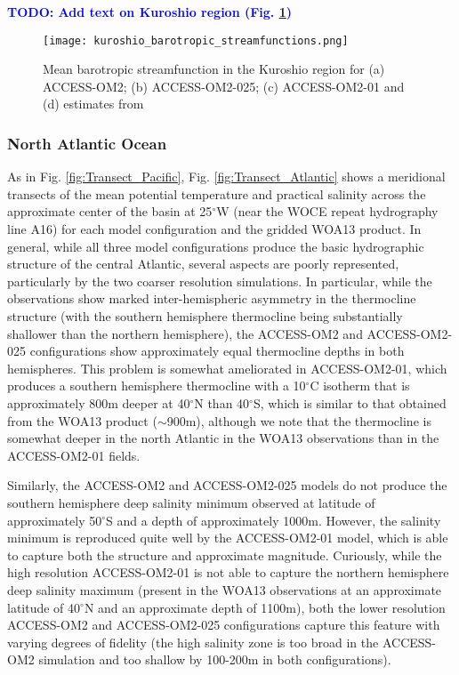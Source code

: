 \documentclass[gmd, manuscript]{copernicus}
\newcommand{\TODO}[1]{\textcolor{blue}{\textsf{\textbf{TODO: #1}}}}
\begin{document}
\TODO{Add text on Kuroshio region (Fig. \ref{fig:kuroshio})}


\begin{figure}[t]
\texttt{[image: kuroshio\_barotropic\_streamfunctions.png]}
\caption{Mean barotropic streamfunction in the Kuroshio region for (a)  ACCESS-OM2; (b) ACCESS-OM2-025; (c) ACCESS-OM2-01 and (d) estimates from \citep{cdvo:2016} \label{fig:kuroshio}}
\end{figure}

\subsubsection{North Atlantic Ocean}

As in Fig. \ref{fig:Transect_Pacific}, Fig. \ref{fig:Transect_Atlantic} shows a meridional transects of the mean potential temperature and practical salinity across the approximate center of the basin at 25$^{\circ}$W (near the WOCE repeat hydrography line A16) for each model configuration and the gridded WOA13 product. In general, while all three model configurations produce the basic hydrographic structure of the central Atlantic, several aspects are poorly represented, particularly by the two coarser resolution simulations. In particular, while the observations show marked inter-hemispheric asymmetry in the thermocline structure (with the southern hemisphere thermocline being substantially shallower than the northern hemisphere), the ACCESS-OM2 and ACCESS-OM2-025 configurations show approximately equal thermocline depths in both hemispheres. This problem is somewhat ameliorated in ACCESS-OM2-01, which produces a southern hemisphere thermocline with a 10$^{\circ}$C isotherm that is approximately 800m deeper at 40$^{\circ}$N than 40$^{\circ}$S, which is similar to that obtained from the WOA13 product ($\sim$900m), although we note that the thermocline is somewhat deeper in the north Atlantic in the WOA13 observations than in the ACCESS-OM2-01 fields. 

Similarly, the ACCESS-OM2 and ACCESS-OM2-025 models do not produce the southern hemisphere deep salinity minimum observed at latitude of approximately 50$^{\circ}$S and a depth of approximately 1000m. However, the salinity minimum is reproduced quite well by the ACCESS-OM2-01 model, which is able to capture both the structure and approximate magnitude. Curiously, while the high resolution ACCESS-OM2-01 is not able to capture the northern hemisphere deep salinity maximum (present in the WOA13 observations at an approximate latitude of 40$^{\circ}$N and an approximate depth of 1100m), both the lower resolution ACCESS-OM2 and ACCESS-OM2-025 configurations capture this feature with varying degrees of fidelity (the high salinity zone is too broad in the ACCESS-OM2 simulation and too shallow by 100-200m in both configurations).
\end{document}
